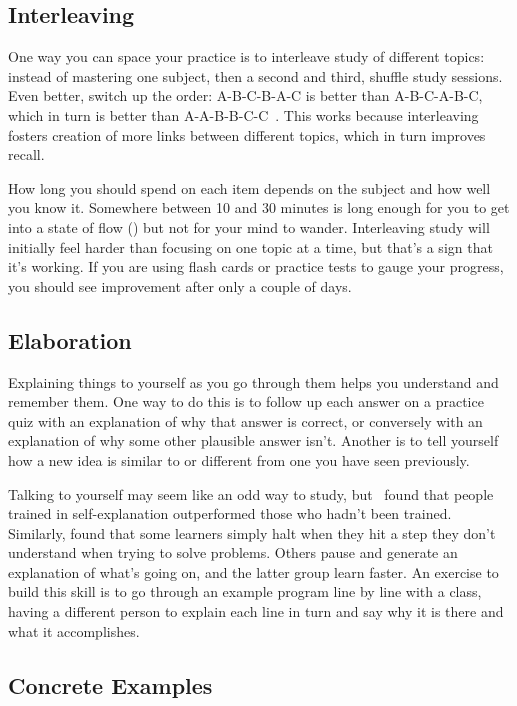 \subsection*{Interleaving}

One way you can space your practice is to interleave study of different topics:
instead of mastering one subject,
then a second and third,
shuffle study sessions.
Even better,
switch up the order:
A-B-C-B-A-C is better than A-B-C-A-B-C,
which in turn is better than A-A-B-B-C-C~\cite{Rohr2015}.
This works because interleaving fosters creation of more links between different topics,
which in turn improves recall.

How long you should spend on each item
depends on the subject and how well you know it.
Somewhere between 10 and 30 minutes is long enough for you to get into
a state of flow ()
but not for your mind to wander.
Interleaving study will initially feel harder than focusing on one topic at a time,
but that's a sign that it's working.
If you are using flash cards or practice tests to gauge your progress,
you should see improvement after only a couple of days.

\subsection*{Elaboration}

Explaining things to yourself as you go through them
helps you understand and remember them.
One way to do this is to follow up each answer on a practice quiz
with an explanation of why that answer is correct,
or conversely with an explanation of why some other plausible answer isn't.
Another is to tell yourself
how a new idea is similar to or different from one you have seen previously.

Talking to yourself may seem like an odd way to study,
but~\cite{Biel1995} found that
people trained in self-explanation outperformed those who hadn't been trained.
Similarly,
\cite{Chi1989} found that some learners simply halt when they hit a step they don't understand
when trying to solve problems.
Others pause and generate an explanation of what's going on,
and the latter group learn faster.
An exercise to build this skill is to go through an example program line by line with a class,
having a different person to explain each line in turn
and say why it is there and what it accomplishes.

\subsection*{Concrete Examples}

